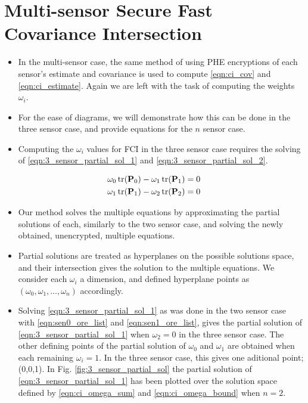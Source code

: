 \documentclass[letterpaper, 10 pt, conference]{ieeeconf}  %
\begin{document}
\section{Multi-sensor Secure Fast Covariance Intersection} \label{sec:multi_secfci}
\begin{itemize}
   \item In the multi-sensor case, the same method of using PHE encryptions of each sensor's estimate and covariance is used to compute \eqref{eqn:ci_cov} and \eqref{eqn:ci_estimate}. Again we are left with the task of computing the weights $\omega_i$.
   \item For the ease of diagrams, we will demonstrate how this can be done in the three sensor case, and provide equations for the $n$ sensor case.
   \item Computing the $\omega_i$ values for FCI in the three sensor case requires the solving of \eqref{eqn:3_sensor_partial_sol_1} and \eqref{eqn:3_sensor_partial_sol_2}.
\end{itemize}
\begin{gather}
   \omega_0 \operatorname{tr}({{\mathbf{P}}}_0) - \omega_1 \operatorname{tr}({{\mathbf{P}}}_1) = 0 \label{eqn:3_sensor_partial_sol_1}\\
   \omega_1 \operatorname{tr}({{\mathbf{P}}}_1) - \omega_2 \operatorname{tr}({{\mathbf{P}}}_2) = 0 \label{eqn:3_sensor_partial_sol_2}
\end{gather}
\begin{itemize}
   \item Our method solves the multiple equations by approximating the partial solutions of each, similarly to the two sensor case, and solving the newly obtained, unencrypted, multiple equations.
   \item Partial solutions are treated as hyperplanes on the possible solutions space, and their intersection gives the solution to the multiple equations. We consider each $\omega_i$ a dimension, and defined hyperplane points as $(\omega_0, \omega_1, \dots, \omega_n)$ accordingly.
   \item Solving \eqref{eqn:3_sensor_partial_sol_1} as was done in the two sensor case with \eqref{eqn:sen0_ore_list} and \eqref{eqn:sen1_ore_list}, gives the partial solution of \eqref{eqn:3_sensor_partial_sol_1} when $\omega_2=0$ in the three sensor case. The other defining points of the partial solution of $\omega_0$ and $\omega_1$ are obtained when each remaining $\omega_i=1$. In the three sensor case, this gives one aditional point; (0,0,1). In Fig. \ref{fig:3_sensor_partial_sol} the partial solution of \eqref{eqn:3_sensor_partial_sol_1} has been plotted over the solution space defined by \eqref{eqn:ci_omega_sum} and \eqref{eqn:ci_omega_bound} when $n=2$.
\end{itemize}
\end{document}

